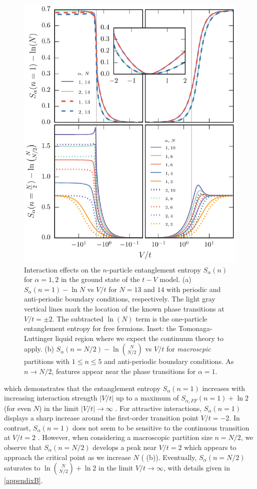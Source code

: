 \begin{figure}[h]
\begin{center}
\includegraphics[width=0.7\columnwidth]{Chapters/EntropiesFigure.pdf}
\end{center}
\caption{Interaction effects on the $n$-particle entanglement entropy
$S_\alpha(n)$ for $\alpha=1,2$ in the ground state of the $t-V$ model. (a)
$S_{\alpha}(n=1)-\ln N$ vs $V/t$ for $N=13$ and $14$ with periodic and
anti-periodic boundary conditions, respectively. The light gray vertical lines
mark the location of the known phase transitions at $V/t=\pm 2$. The
subtracted $\ln (N)$ term is the one-particle entanglement
entropy for free fermions.  Inset: the Tomonaga-Luttinger liquid
region where we expect the continuum theory to apply. (b)
$S_{\alpha}(n=N/2)-\ln \binom{N}{N/2}$ vs
$V/t$ for \emph{macroscpic} partitions with $1\le n\le5$ and anti-periodic
boundary conditions. As $n \to N/2$, features appear near the phase transitions
for $\alpha=1$.} 
\label{fig:EntropiesFigure} 
\end{figure}
% 
which demonstrates that the entanglement entropy $S_{\alpha}(n=1)$ increases
with increasing interaction strength $|V/t|$ up to a maximum of $
S_{\alpha,FF}(n=1)+\ln 2$ (for even $N$) in the limit $|V/t| \rightarrow
\infty$ \cite{Zozulya:2008kb,Haque:2009df}.  For attractive interactions,
$S_{\alpha}(n=1)$ displays a sharp increase around the first-order transition
point $V/t = -2$. In contrast, $S_{\alpha}(n=1)$ does not seem to be sensitive
to the continuous transition at $V/t=2$ \cite{Zozulya:2008kb}. However,
when considering a macroscopic partition size $n=N/2$, we observe that
$S_{\alpha}(n=N/2)$ develops a peak near $V/t=2$ which appears to
approach the critical point as we increase $N$ (
(b)). Eventually, $S_{\alpha}(n=N/2)$ saturates to $\ln \binom{N}{N/2}+\ln2$ in
the limit $V/t\rightarrow\infty$, with details given in \ref{appendixB}. 
 
